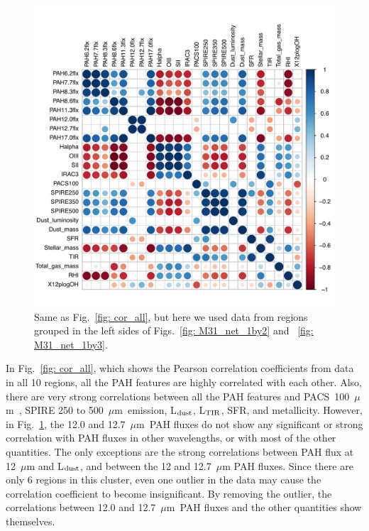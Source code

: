         \begin{figure}
        \includegraphics[width=\textwidth]{../images0.01/cor_plots/M31_derived_3_to_8_core_plot_for_paper.pdf}%
        \caption{Same as Fig.~\ref{fig: cor_all}, but here we used data from regions grouped in the left sides of Figs.~\ref{fig: M31_net_1by2} and ~\ref{fig: M31_net_1by3}. }
          \label{fig: cor_cluster1}
        \end{figure}
        
        In Fig.~\ref{fig: cor_all}, which shows the Pearson correlation coefficients from data in all 10 regions, all the PAH features are highly correlated with each other. 
        Also, there are very strong correlations between all the PAH features and PACS~100~$\mu$m~, SPIRE 250 to 500~$\mu$m~emission, L$_{\rm dust}$, L$_{\rm TIR}$, SFR, and metallicity.
        However, in Fig.~\ref{fig: cor_cluster1}, the 12.0 and 12.7~$\mu$m~PAH fluxes do not show any significant or strong correlation with PAH fluxes in other wavelengths, or with most of the other quantities.
        The only exceptions are the strong correlations between PAH flux at 12~$\mu$m and L$_{\rm dust}$, and between the 12 and 12.7~$\mu$m PAH fluxes.
        Since there are only 6 regions in this cluster, even one outlier in the data may cause the correlation coefficient to become insignificant.
        By removing the outlier, the correlations between 12.0 and 12.7~$\mu$m~PAH fluxes and the other quantities show themselves. %
        
